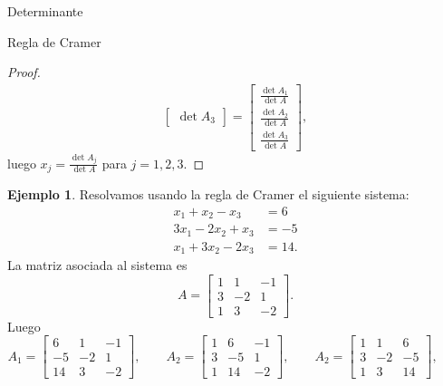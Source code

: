\documentclass[a4paper,12pt,twoside,spanish,reqno]{amsbook}
\theoremstyle{definition}
\newtheorem{ejemplo}{Ejemplo}[section]
\theoremstyle{remark}
\begin{document}
\begin{chapter}{Determinante}
\begin{section}{Regla de Cramer}
\begin{proof}
\begin{align*}
\begin{bmatrix}
                 \det A_3 \end{bmatrix} = \begin{bmatrix} \frac{\det A_1}{\det A}\\
                 \frac{\det A_2}{\det A} \\
                 \frac{\det A_3}{\det A}\end{bmatrix},
                 \end{align*}
                 luego $x_j = \displaystyle\frac{\det A_j}{\det A}$ para $j =1,2,3$.
             \end{proof}
             
             \begin{ejemplo}
                 Resolvamos usando la regla de Cramer el siguiente sistema:
                 \begin{align*}
                 x_1 + x_2 - x_3 &= 6 \\
                 3x_1 -2 x_2 + x_3 &= -5 \\ 
                 x_1 +3 x_2 - 2x_3 &= 14.
                 \end{align*}
                 La matriz asociada al sistema es 
                 $$
                 A= \begin{bmatrix}
                 1 &1  &-1 \\
                 3 &-2  &1 \\ 
                 1 &3 &-2
                 \end{bmatrix}.
                 $$
                 Luego 
                 $$
                 A_1 = \begin{bmatrix}
                 6 &1  &-1 \\
                 -5 &-2  &1 \\ 
                 14 &3 &-2
                 \end{bmatrix}, \qquad
                 A_2 = \begin{bmatrix}
                 1 &6  &-1 \\
                 3 &-5  &1 \\ 
                 1 &14 &-2
                 \end{bmatrix}, \qquad
                 A_2 = \begin{bmatrix}
                 1 &1  &6 \\
                 3 &-2  &-5 \\ 
                 1 &3 &14
                 \end{bmatrix}, \qquad
                 $$

\end{ejemplo}
\end{section}
\end{chapter}
\end{document}
